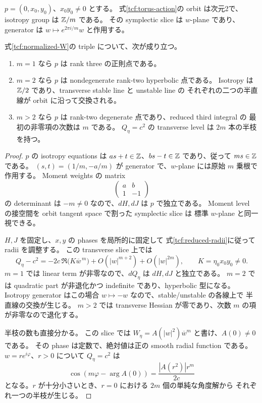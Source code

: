 \begin{theorem}\label{tcf:center-classification}
$p=(0,x_0,y_0)$、$x_0y_0\ne0$ とする。
式\eqref{tcf:torus-action}の orbit は次元2で、isotropy group は $\mathbb Z/m$ である。
その symplectic slice は $w$-plane であり、generator は
$w\mapsto e^{2\pi i/m}w$ と作用する。

式\eqref{tcf:normalized-W}の triple について、次が成り立つ。
\begin{enumerate}
 \item $m=1$ なら $p$ は rank three の正則点である。
 \item $m=2$ なら $p$ は nondegenerate rank-two hyperbolic 点である。
       Isotropy は $\mathbb Z/2$ であり、transverse stable line と unstable line の
       それぞれの二つの半直線が orbit に沿って交換される。
 \item $m>2$ なら $p$ は rank-two degenerate 点であり、reduced third integral の
       最初の非零項の次数は $m$ である。
       $Q_\eta=c^2$ の transverse level は $2m$ 本の半枝を持つ。
\end{enumerate}
\end{theorem}

\begin{proof}
$p$ の isotropy equations は
$as+t\in\mathbb Z$、$bs-t\in\mathbb Z$ であり、従って $ms\in\mathbb Z$ である。
$(s,t)=(1/m,-a/m)$ が generator で、$w$-plane には原始 $m$ 乗根で作用する。
Moment weights の matrix
\[
 \begin{pmatrix}a&b\\1&-1\end{pmatrix}
\]
の determinant は $-m\ne0$ なので、$dH,dJ$ は $p$ で独立である。
Moment level の接空間を orbit tangent space で割った symplectic slice は
標準 $w$-plane と同一視できる。

$H,J$ を固定し、$x,y$ の phases を局所的に固定して
式\eqref{tcf:reduced-radii}に従って radii を調整する。
この transverse slice 上では
\begin{equation}\label{tcf:leading-term}
 Q_\eta-c^2=-2c\,\Re\bigl(K\overline w^{\,m}\bigr)
             +O(|w|^{m+2})+O(|w|^{2m}),
 \qquad K=\eta_0x_0y_0\ne0.
\end{equation}
$m=1$ では linear term が非零なので、$dQ_\eta$ は $dH,dJ$ と独立である。
$m=2$ では quadratic part が非退化かつ indefinite であり、hyperbolic 型になる。
Isotropy generator はこの場合 $w\mapsto-w$ なので、stable/unstable の各線上で
半直線の交換が生じる。
$m>2$ では transverse Hessian が零であり、次数 $m$ の項が非零なので退化する。

半枝の数も直接分かる。
この slice では $W_\eta=A(|w|^2)\overline w^m$ と書け、$A(0)\ne0$ である。
その phase は定数で、絶対値は正の smooth radial function である。
$w=re^{i\varphi}$、$r>0$ について $Q_\eta=c^2$ は
\[
 \cos(m\varphi-\arg A(0))=\frac{|A(r^2)|r^m}{2c}
\]
となる。$r$ が十分小さいとき、$r=0$ における $2m$ 個の単純な角度解から
それぞれ一つの半枝が生じる。
\end{proof}

